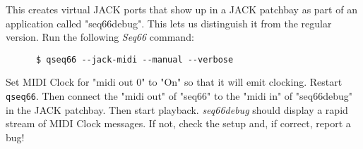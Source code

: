    This creates virtual JACK ports that show up in a JACK patchbay as part of
   an application called "seq66debug".  This lets us distinguish it from
   the regular version.  Run the following \textsl{Seq66} command:

   \begin{verbatim}
      $ qseq66 --jack-midi --manual --verbose
   \end{verbatim}

   Set MIDI Clock for "midi out 0" to "On" so that it will emit clocking.
   Restart \texttt{qseq66}.
   Then connect the "midi out" of "seq66" to the "midi in" of "seq66debug"
   in the JACK patchbay.
   Then start playback.
   \textsl{seq66debug} should display a rapid stream of MIDI Clock messages.
   If not, check the setup and, if correct, report a bug!

